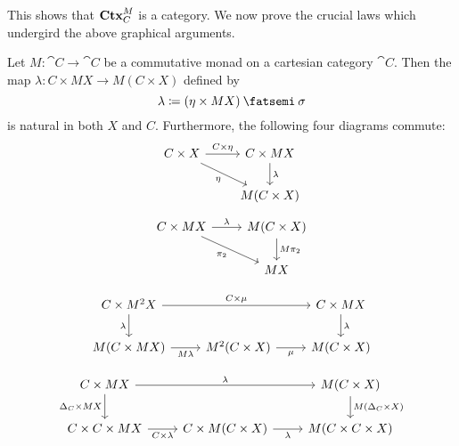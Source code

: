 \documentclass[DynamicalBook]{subfiles}
\begin{document}
This shows that $\textbf{Ctx}_{C}^M$ is a category. We now prove the crucial laws which undergird the above graphical arguments.

\begin{lemma}\label{lem.dist_law}
Let $M : \cat{C} \to \cat{C}$ be a commutative monad on a cartesian category
$\cat{C}$. Then the map $\lambda : C \times M X \to M(C \times X)$ defined by
$$\lambda \coloneqq (\eta \times MX) \then \sigma$$
is natural in both $X$ and $C$. Furthermore, the following four diagrams
commute:
\begin{equation}\label{eqn.dist_law_right}
\begin{tikzcd}
C \times X \arrow[rd, "\eta"'] \arrow[r, "C \times \eta"] & C \times MX \arrow[d, "\lambda"] \\
                                                          & M(C \times X)                   
\end{tikzcd}
\end{equation}\label{eqn.dist_law_left}
\begin{equation}
\begin{tikzcd}
C \times MX \arrow[r, "\lambda"] \arrow[rd, "\pi_2"'] & M(C \times X) \arrow[d, "M\pi_2"] \\
                                                      & MX                               
\end{tikzcd}
\end{equation}

\begin{equation}\label{eqn.dist_law_mult_right}
\begin{tikzcd}
C \times M^2X \arrow[d, "\lambda"'] \arrow[rr, "C \times \mu"] &                                   & C \times M X \arrow[d, "\lambda"] \\
M(C \times M X) \arrow[r, "M\lambda"']                          & M^2(C \times X) \arrow[r, "\mu"'] & M(C \times X)                    
\end{tikzcd}
\end{equation}

\begin{equation}\label{eqn.dist_law_mult_right}
\begin{tikzcd}
C \times MX \arrow[rr, "\lambda"] \arrow[d, "\Delta_C \times MX"'] &                                              & M(C \times X) \arrow[d, "M(\Delta_C \times X)"] \\
C \times C \times MX \arrow[r, "C \times \lambda"']                & C \times M(C \times X) \arrow[r, "\lambda"'] & M(C \times C \times X)                         
\end{tikzcd}
\end{equation}
\end{lemma}
\end{document}
